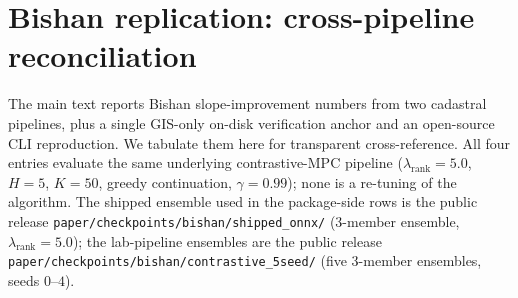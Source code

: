 \documentclass[11pt]{article}
\begin{document}
\section{Bishan replication: cross-pipeline reconciliation}\label{si:bishan-regimes}

The main text reports Bishan slope-improvement numbers from two cadastral pipelines, plus a single GIS-only on-disk verification anchor and an open-source CLI reproduction. We tabulate them here for transparent cross-reference. All four entries evaluate the same underlying contrastive-MPC pipeline (\(\lambda_{\text{rank}}{=}5.0\), $H{=}5$, $K{=}50$, greedy continuation, $\gamma{=}0.99$); none is a re-tuning of the algorithm. The shipped ensemble used in the package-side rows is the public release \texttt{paper/checkpoints/bishan/shipped\_onnx/} (3-member ensemble, $\lambda_{\text{rank}}{=}5.0$); the lab-pipeline ensembles are the public release \texttt{paper/checkpoints/bishan/contrastive\_5seed/} (five 3-member ensembles, seeds $0$--$4$).
\end{document}
